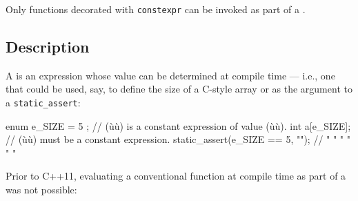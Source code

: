 



\label{compile-time-invocable-functions}
\setcounter{table}{0}
\setcounter{footnote}{0}
\setcounter{lstlisting}{0}



Only functions decorated with \lstinline!constexpr! can be invoked as part
of a .

\subsection[Description]{Description}\label{description}

A  is an expression whose value can be
determined at compile time --- i.e., one that could be used, say, to
define the size of a C-style array or as the argument to a
\lstinline!static_assert!:

\begin{emcppslisting}
enum { e_SIZE = 5 };             // (ù{}ù) is a constant expression of value (ù{}ù).
int a[e_SIZE];                   // (ù{}ù) must be a constant expression.
static_assert(e_SIZE == 5, "");  //    "     "   " "     "          "
\end{emcppslisting}
    
\noindent Prior to C++11, evaluating a conventional function at compile time as
part of a  was not possible:

